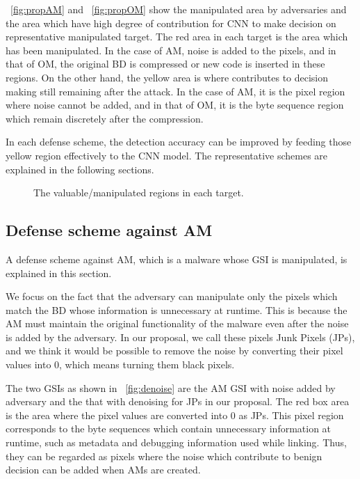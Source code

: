 \documentclass{ieeeaccess}
\begin{document}
\figurename~\ref{fig:propAM} and \figurename~\ref{fig:propOM} show the manipulated area by adversaries and the area which have high degree of contribution for CNN to make decision on representative manipulated target.
The red area in each target is the area which has been manipulated.
In the case of AM, noise is added to the pixels, and in that of OM, the original BD is compressed or new code is inserted in these regions.
On the other hand, the yellow area is where contributes to decision making still remaining after the attack.
In the case of AM, it is the pixel region where noise cannot be added, and in that of OM, it is the byte sequence region which remain discretely after the compression.

In each defense scheme, the detection accuracy can be improved by feeding those yellow region effectively to the CNN model.
The representative schemes are explained in the following sections.

\begin{figure}[t]
 \centering
 \caption{The valuable/manipulated regions in each target.} 
 \label{fig:prop}
\end{figure}

\subsection{Defense scheme against AM}
A defense scheme against AM, which is a malware whose GSI is manipulated, is explained in this section.

We focus on the fact that the adversary can manipulate only the pixels which match the BD whose information is unnecessary at runtime.
This is because the AM must maintain the original functionality of the malware even after the noise is added by the adversary.
In our proposal, we call these pixels Junk Pixels (JPs), and we think it would be possible to remove the noise by converting their pixel values into 0, which means turning them black pixels.

The two GSIs as shown in \figurename~\ref{fig:denoise} are the AM GSI with noise added by adversary and the that with denoising for JPs in our proposal.
The red box area is the area where the pixel values are converted into 0 as JPs.
This pixel region corresponds to the byte sequences which contain unnecessary information at runtime, such as metadata and debugging information used while linking.
Thus, they can be regarded as pixels where the noise which contribute to benign decision can be added when AMs are created.
\end{document}
